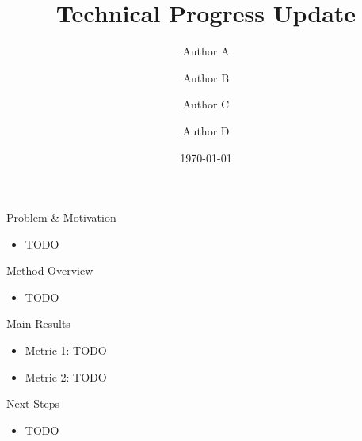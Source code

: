 \documentclass{beamer}
\title{Technical Progress Update}
\author{Author A \and Author B \and Author C \and Author D}
\date{\today}
\begin{document}
\begin{frame}
  \titlepage
\end{frame}

\begin{frame}{Problem \& Motivation}
  \begin{itemize}
    \item TODO
  \end{itemize}
\end{frame}

\begin{frame}{Method Overview}
  \begin{itemize}
    \item TODO
  \end{itemize}
\end{frame}

\begin{frame}{Main Results}
  \begin{itemize}
    \item Metric 1: TODO
    \item Metric 2: TODO
  \end{itemize}
\end{frame}

\begin{frame}{Next Steps}
  \begin{itemize}
    \item TODO
  \end{itemize}
\end{frame}
\end{document}
